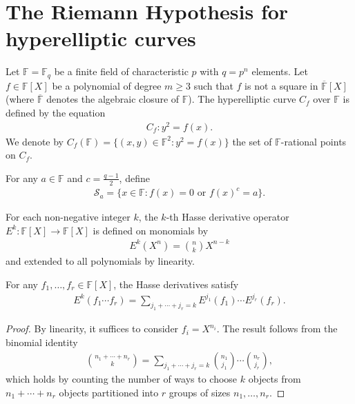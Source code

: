 \section{The Riemann Hypothesis for hyperelliptic curves}

\begin{definition}\label{def:hyperelliptic-curve} \leanok {}
  Let $\mathbb{F} = \mathbb{F}_q$ be a finite field of characteristic $p$ with $q = p^n$ elements. Let $f \in \mathbb{F}[X]$ be a polynomial of degree $m \geq 3$ such that $f$ is not a square in $\overline{\mathbb{F}}[X]$ (where $\overline{\mathbb{F}}$ denotes the algebraic closure of $\mathbb{F}$). The hyperelliptic curve $C_f$ over $\mathbb{F}$ is defined by the equation
  \begin{align*}
    C_f : y^2 = f(x).
  \end{align*}
  We denote by $C_f(\mathbb{F}) = \{(x,y) \in \mathbb{F}^2 : y^2 = f(x)\}$ the set of $\mathbb{F}$-rational points on $C_f$.
\end{definition}

\begin{definition}\label{def:set-sa} \leanok {}
  For any $a \in \mathbb{F}$ and $c = \frac{q-1}{2}$, define
  \begin{align*}
    \mathcal{S}_a = \{x \in \mathbb{F} : f(x) = 0 \text{ or } f(x)^c = a\}.
  \end{align*}
\end{definition}

\begin{definition}\label{def:hasse-derivative} \leanok {}
  For each non-negative integer $k$, the $k$-th Hasse derivative operator $E^k : \mathbb{F}[X] \to \mathbb{F}[X]$ is defined on monomials by
  \begin{align*}
    E^k(X^n) = \binom{n}{k} X^{n-k}
  \end{align*}
  and extended to all polynomials by linearity.
\end{definition}

\begin{lemma}\label{lem:hasse-leibniz} \leanok {}
  For any $f_1, \ldots, f_r \in \mathbb{F}[X]$, the Hasse derivatives satisfy
  \begin{align*}
    E^k(f_1 \cdots f_r) = \sum_{j_1 + \cdots + j_r = k} E^{j_1}(f_1) \cdots E^{j_r}(f_r).
  \end{align*}
\end{lemma}
\begin{proof} \leanok
  By linearity, it suffices to consider $f_i = X^{n_i}$. The result follows from the binomial identity
  \begin{align*}
    \binom{n_1 + \cdots + n_r}{k} = \sum_{j_1 + \cdots + j_r = k} \binom{n_1}{j_1} \cdots \binom{n_r}{j_r},
  \end{align*}
  which holds by counting the number of ways to choose $k$ objects from $n_1 + \cdots + n_r$ objects partitioned into $r$ groups of sizes $n_1, \ldots, n_r$.
\end{proof}

